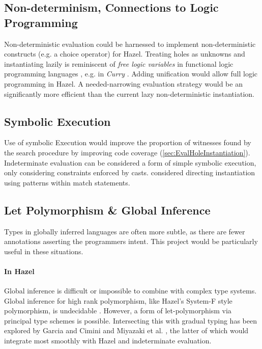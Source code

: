\subsection{Non-determinism, Connections to Logic Programming}
\label{sec:LogicProgramming}
Non-deterministic evaluation could be harnessed to implement non-deterministic constructs (e.g. a choice operator) for Hazel. Treating holes as unknowns and instantiating lazily is reminiscent of \textit{free logic variables} in functional logic programming languages \cite{FunctionalLogicProgramming}, e.g. in \textit{Curry} \cite{CurryLang}. Adding unification \cite{UnificationSurvey} would allow full logic programming in Hazel. A needed-narrowing evaluation strategy \cite{NeededNarrowing} would be an significantly more efficient than the current lazy non-deterministic instantiation.

\subsection{Symbolic Execution}
Use of symbolic Execution \cite{SymbolicExecutionSurvey} would improve the proportion of witnesses found by the search procedure by improving code coverage (\cref{sec:EvalHoleInstantiation}). Indeterminate evaluation can be considered a form of simple {symbolic execution}, only considering constraints enforced by casts.  considered directing instantiation using patterns within match statements. 

\subsection{Let Polymorphism \& Global Inference}
Types in globally inferred languages are often more subtle, as there are fewer annotations asserting the programmers intent. This project would be particularly useful in these situations.

\paragraph{In Hazel}
Global inference is difficult or impossible to combine with complex type systems. Global inference for high rank polymorphism, like Hazel's System-F style polymorphism, is undecidable \cite{SystemFUndecidable}.  However, a form of let-polymorphism via principal type schemes \cite{PrincipleTypeSchemes} is possible. Intersecting this with gradual typing has been explored by Garcia and Cimini \cite{GradualTI} and Miyazaki et al. \cite{DTI}, the latter of which would integrate most smoothly with Hazel and indeterminate evaluation.

